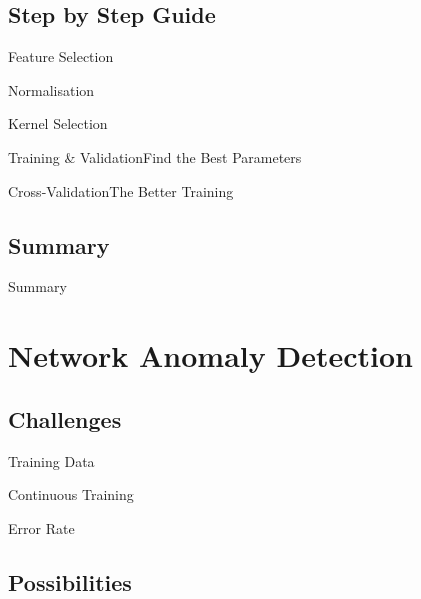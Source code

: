 \documentclass{beamer}
\begin{document}
\subsection{Step by Step Guide}

\begin{frame}{Feature Selection}
\end{frame}

\begin{frame}{Normalisation}
\end{frame}

\begin{frame}{Kernel Selection}
\end{frame}

\begin{frame}{Training \& Validation}{Find the Best Parameters}
\end{frame}

\begin{frame}{Cross-Validation}{The Better Training}
\end{frame}

\subsection*{Summary}
\begin{frame}{Summary}
\end{frame}

\section{Network Anomaly Detection}

\subsection{Challenges}

\begin{frame}{Training Data}
\end{frame}

\begin{frame}{Continuous Training}
\end{frame}

\begin{frame}{Error Rate}
\end{frame}


\subsection{Possibilities}
\end{document}
